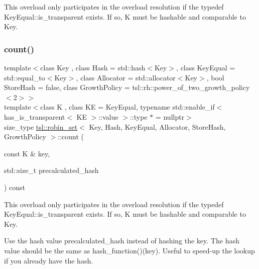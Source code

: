 This overload only participates in the overload resolution if the typedef Key\+Equal\+::is\+\_\+transparent exists. If so, K must be hashable and comparable to Key. \mbox{\label{classtsl_1_1robin__set_a99c7d370f9c022a7054b2fc966ecade4}} 
\subsubsection{\texorpdfstring{count()}{count()}\hspace{0.1cm}{\footnotesize\ttfamily [3/3]}}
{\footnotesize\ttfamily template$<$class Key , class Hash  = std\+::hash$<$\+Key$>$, class Key\+Equal  = std\+::equal\+\_\+to$<$\+Key$>$, class Allocator  = std\+::allocator$<$\+Key$>$, bool Store\+Hash = false, class Growth\+Policy  = tsl\+::rh\+::power\+\_\+of\+\_\+two\+\_\+growth\+\_\+policy$<$2$>$$>$ \\
template$<$class K , class KE  = Key\+Equal, typename std\+::enable\+\_\+if$<$ has\+\_\+is\+\_\+transparent$<$ K\+E $>$\+::value $>$\+::type $\ast$  = nullptr$>$ \\
size\+\_\+type \mbox{\hyperlink{classtsl_1_1robin__set}{tsl\+::robin\+\_\+set}}$<$ Key, Hash, Key\+Equal, Allocator, Store\+Hash, Growth\+Policy $>$\+::count (\begin{DoxyParamCaption}\item[{const K \&}]{key,  }\item[{std\+::size\+\_\+t}]{precalculated\+\_\+hash }\end{DoxyParamCaption}) const\hspace{0.3cm}{\ttfamily [inline]}}





This overload only participates in the overload resolution if the typedef Key\+Equal\+::is\+\_\+transparent exists. If so, K must be hashable and comparable to Key.

Use the hash value \textquotesingle{}precalculated\+\_\+hash\textquotesingle{} instead of hashing the key. The hash value should be the same as hash\+\_\+function()(key). Useful to speed-\/up the lookup if you already have the hash. \mbox{\label{classtsl_1_1robin__set_a350aac536c0c747908707788035f2d92}} 
